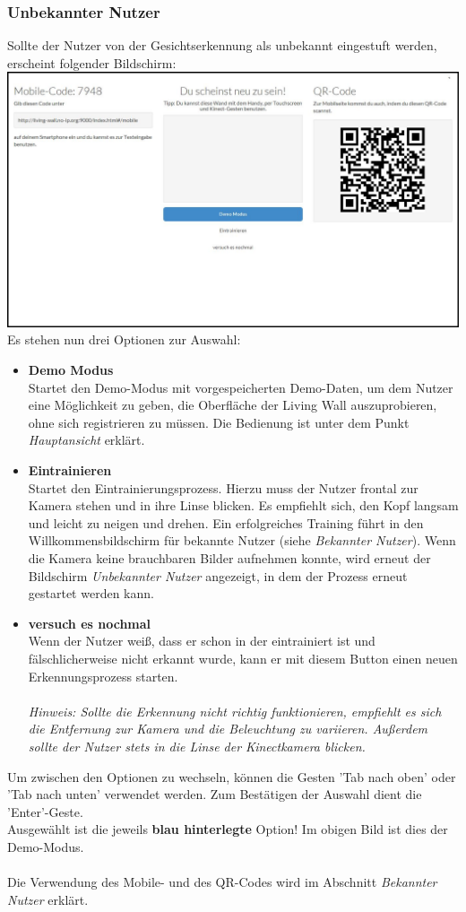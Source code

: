 \documentclass[10pt,a4paper]{report}
\begin{document}
		\subsubsection{Unbekannter Nutzer}
		Sollte der Nutzer von der Gesichtserkennung als unbekannt eingestuft werden, erscheint folgender Bildschirm:\\
		\includegraphics[scale=0.31]{UnknownUser}\\
		Es stehen nun drei Optionen zur Auswahl:
			\begin{itemize}
				\item \textbf{Demo Modus}\\
				Startet den Demo-Modus mit vorgespeicherten Demo-Daten, um dem Nutzer eine Möglichkeit zu geben, die Oberfläche der Living Wall auszuprobieren, ohne sich registrieren zu müssen. Die Bedienung ist unter dem Punkt 		\textit{Hauptansicht} erklärt.
				\item \textbf{Eintrainieren}\\
				Startet den Eintrainierungsprozess. Hierzu muss der Nutzer frontal zur Kamera stehen und in ihre Linse blicken. Es empfiehlt sich, den Kopf langsam und leicht zu neigen und drehen. Ein erfolgreiches Training führt in den Willkommensbildschirm für bekannte Nutzer (siehe \textit{Bekannter Nutzer}). Wenn die Kamera keine brauchbaren Bilder aufnehmen konnte, wird erneut der Bildschirm \textit{Unbekannter Nutzer} angezeigt, in dem der Prozess erneut gestartet werden kann.
				\item \textbf{versuch es nochmal}\\
				Wenn der Nutzer weiß, dass er schon in der eintrainiert ist und fälschlicherweise nicht erkannt wurde, kann er mit diesem Button einen neuen Erkennungsprozess starten.\\ \\
				\textit{Hinweis: Sollte die Erkennung nicht richtig funktionieren, empfiehlt es sich die Entfernung zur Kamera und die Beleuchtung zu variieren. Außerdem sollte der Nutzer stets in die Linse der Kinectkamera blicken.}
			\end{itemize}
		Um zwischen den Optionen zu wechseln, können die Gesten 'Tab nach oben' oder 'Tab nach unten' verwendet werden. Zum Bestätigen der Auswahl dient die 'Enter'-Geste.\\
Ausgewählt ist die jeweils \textbf{blau hinterlegte} Option! Im obigen Bild ist dies der Demo-Modus.\\ \\
Die Verwendung des Mobile- und des QR-Codes wird im Abschnitt \textit{Bekannter Nutzer} erklärt.
\end{document}
